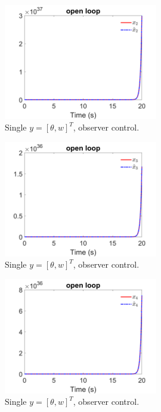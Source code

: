 \documentclass[12pt]{article}
\numberwithin{equation}{section}
\begin{document}
\begin{figure}[!ht]
    \centering
    \includegraphics[width=0.6\textwidth]{double_output_observer/fig2.png}
    \caption{Single $y = [\theta,w]^T$, observer control.}
\end{figure}

\begin{figure}[!ht]
    \centering
    \includegraphics[width=0.6\textwidth]{double_output_observer/fig3.png}
    \caption{Single $y = [\theta,w]^T$, observer control.}
\end{figure}

\begin{figure}[!ht]
    \centering
    \includegraphics[width=0.6\textwidth]{double_output_observer/fig4.png}
    \caption{Single $y = [\theta,w]^T$, observer control.}
\end{figure}
\end{document}
